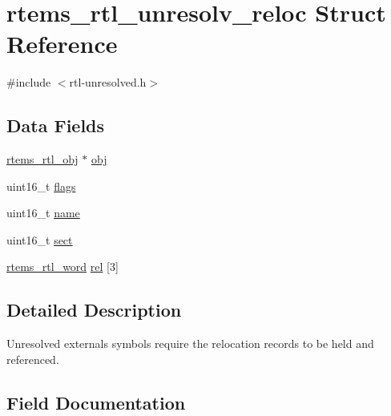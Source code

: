 \hypertarget{structrtems__rtl__unresolv__reloc}{}\section{rtems\+\_\+rtl\+\_\+unresolv\+\_\+reloc Struct Reference}
\label{structrtems__rtl__unresolv__reloc}


{\ttfamily \#include $<$rtl-\/unresolved.\+h$>$}

\subsection*{Data Fields}
\begin{DoxyCompactItemize}
\item 
\mbox{\hyperlink{structrtems__rtl__obj}{rtems\+\_\+rtl\+\_\+obj}} $\ast$ \mbox{\hyperlink{structrtems__rtl__unresolv__reloc_a15c4d72267ba5ed6c33b4c4d0fb45ac9}{obj}}
\item 
uint16\+\_\+t \mbox{\hyperlink{structrtems__rtl__unresolv__reloc_a30d03160668de19657d3d4d6c0d046bf}{flags}}
\item 
uint16\+\_\+t \mbox{\hyperlink{structrtems__rtl__unresolv__reloc_a56ed5f0d494357d7e1dda596f554d173}{name}}
\item 
uint16\+\_\+t \mbox{\hyperlink{structrtems__rtl__unresolv__reloc_a8f4557713d50720b00d7dd40931a6f97}{sect}}
\item 
\mbox{\hyperlink{rtl-unresolved_8h_a5ab1ca8c94e49686f84f5ccf0731f0e6}{rtems\+\_\+rtl\+\_\+word}} \mbox{\hyperlink{structrtems__rtl__unresolv__reloc_a62d7c6256d4125815795ce68370cacde}{rel}} \mbox{[}3\mbox{]}
\end{DoxyCompactItemize}


\subsection{Detailed Description}
Unresolved externals symbols require the relocation records to be held and referenced. 

\subsection{Field Documentation}
\mbox{\label{structrtems__rtl__unresolv__reloc_a30d03160668de19657d3d4d6c0d046bf}} 
